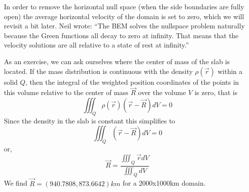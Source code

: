 In order to remove the horizontal null space (when the side boundaries are fully open) 
the average horizontal velocity of the domain is set to zero,
which we will revisit a bit later. Neil wrote: ``The BEM 
solves the nullspace problem naturally because the Green functions
all decay to zero at infinity. That means that the velocity solutions 
are all relative to a state of rest at infinity.''

As an exercise, we can ask ourselves where the center of mass of the slab is located.
If the mass distribution is continuous with the density $\rho(\vec{r})$ 
within a solid $Q$, then the integral of the weighted position coordinates 
of the points in this volume relative to the center of mass $\vec{R}$ over the volume $V$ is zero, 
that is
\[
\iiint_Q \rho(\vec{r}) (\vec{r}-\vec{R}) dV =0
\]
Since the density in the slab is constant this simplifies to 
\[
\iiint_Q  (\vec{r}-\vec{R}) dV =0
\]
or, 
\[
\vec{R} = \frac{ \iiint_Q  \vec{r} dV}{\iiint_Q  dV}
\]
We find $\vec{R}=(940.7808, 873.6642)km$ for a 2000x1000km domain.




